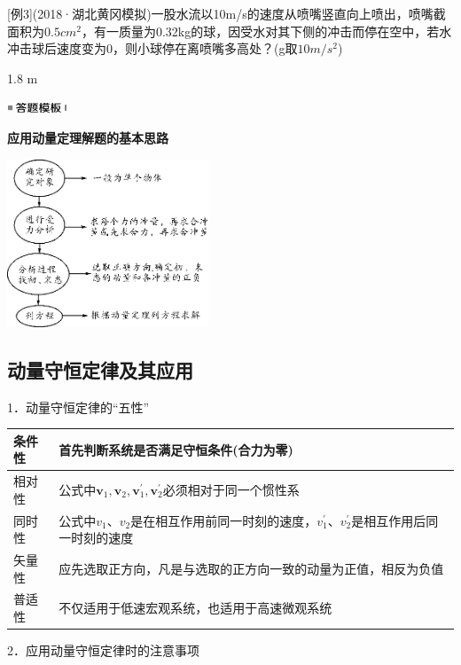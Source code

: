 \documentclass[cn,10.5pt,chinese,mac,chinesefont=founder]{elegantbook}
\begin{document}
{[}例3{]}(2018·湖北黄冈模拟)一股水流以10m/s的速度从喷嘴竖直向上喷出，喷嘴截面积为$0.5 cm^2$，有一质量为0.32kg的球，因受水对其下侧的冲击而停在空中，若水冲击球后速度变为0，则小球停在离喷嘴多高处？(g取$10m/s^2$)
\begin{solution}
	1.8 m
\end{solution}

\begin{center}\includegraphics[width=0.70764in,height=0.12292in]{media/image25.png}

\textbf{应用动量定理解题的基本思路}
\end{center}


\begin{center}\includegraphics[width=2.36806in,height=1.97153in]{media/image250.png}\end{center}

	

\subsection{动量守恒定律及其应用}

1．动量守恒定律的``五性''

\begin{longtable}[]{@{}ll@{}}
\toprule
条件性 & 首先判断系统是否满足守恒条件(合力为零)\tabularnewline
\midrule
\endhead
相对性 & 公式中$\boldsymbol{v}_{1}, \boldsymbol{v}_{2}, \boldsymbol{v}_{1}^{\prime}, \boldsymbol{v}_{2}^{\prime}$必须相对于同一个惯性系\tabularnewline
同时性 &
公式中$v_1$、$v_2$是在相互作用前同一时刻的速度，$v_1^\prime$、$v_2^\prime$是相互作用后同一时刻的速度\tabularnewline
矢量性 &
应先选取正方向，凡是与选取的正方向一致的动量为正值，相反为负值\tabularnewline
普适性 & 不仅适用于低速宏观系统，也适用于高速微观系统\tabularnewline
\bottomrule
\end{longtable}

2．应用动量守恒定律时的注意事项
\end{document}
